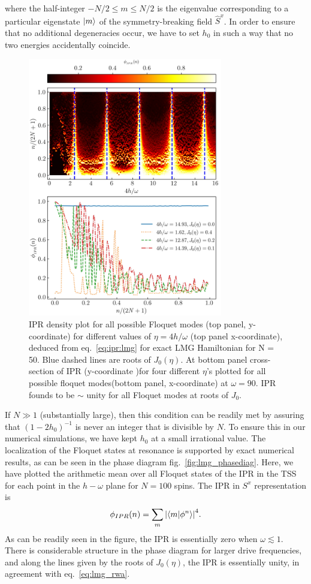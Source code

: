 \documentclass[%
reprint,
superscriptaddress,
amsmath,amssymb,
aps,
prb,
showkeys,
]{revtex4-2}
\begin{document}
where the half-integer $-N/2\leq m \leq N/2$ is the eigenvalue corresponding to a particular eigenstate $\ket{m}$ of the symmetry-breaking field $\hat{S}^x$. In order to ensure that no additional degeneracies occur, we have to set $h_0$ in  such a way that no two energies accidentally coincide.
\begin{figure}[t!]
	\centering
	\includegraphics[width = 8.5cm]{ipr_exact_dynm_N50_frq_90_.jpeg}
	\caption{IPR density plot for all possible Floquet modes (top panel, y-coordinate) for different values of $\eta = 4h/\omega$ (top panel x-coordinate), deduced from eq.~\ref{eq:ipr:lmg} for exact LMG Hamiltonian for N = 50. Blue dashed lines are roots of $J_0(\eta)$. At bottom panel cross-section of IPR (y-coordinate )for four different $\eta$'s plotted for all possible floquet modes(bottom panel, x-coordinate) at $\omega=90$. IPR founds to be $\sim$ unity for all Floquet modes at roots of $J_0$.}
	\label{fig:lmg_ipr_exact}
\end{figure}
If $N\gg 1$ (substantially large), then this condition can be readily met by assuring that $(1-2h_0)^{-1}$ is never an integer that is divisible by $N$. To ensure this in our numerical simulations, we have kept $h_0$ at a small irrational value.
The localization of the Floquet states at resonance is supported by exact numerical results, as can be seen in the phase diagram fig.~\ref{fig:lmg_phasediag}. Here, we have plotted the arithmetic mean over all Floquet states of the IPR 
in the TSS for each point in the $h-\omega$ plane for $N=100$ spins.  The IPR in $S^x$ representation is
\begin{equation}
	\phi_{IPR}(n) = \sum_m \abs{\ip{m}{\phi^n}}^4.
	\label{eq:ipr:lmg}
\end{equation}
As can be readily seen in the figure, the IPR is essentially zero when  $\omega \lesssim 1$. There is considerable structure in the phase diagram for larger drive frequencies, and along the lines given by the roots of $J_0(\eta)$, the IPR is essentially unity, in agreement with eq.~\ref{eq:lmg_rwa}.
\end{document}
